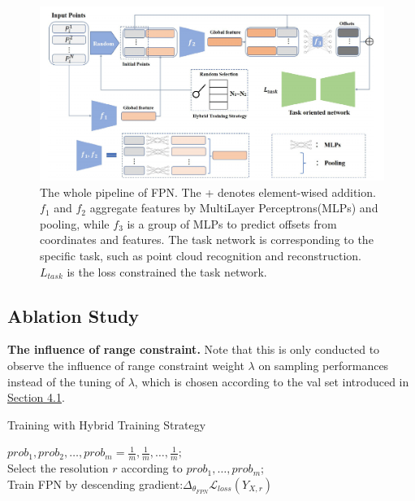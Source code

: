 \documentclass[14pt]{article}
\begin{document}
\begin{multicols}{2}
\begin{figure}
  \includegraphics[width=\linewidth]{image2.png}
  \caption{The whole pipeline of FPN. The + denotes element-wised addition. $f_1$ and $f_2$ aggregate features by MultiLayer Perceptrons(MLPs) and pooling, while $f_3$ is a group of MLPs to predict offsets from coordinates and features. The task network is corresponding to the speciﬁc task, such as point cloud recognition and reconstruction. $L_{task}$ is the loss constrained the task network.}
 \label{fig:fig2}
\end{figure}

\subsection{Ablation Study}
\textbf{The influence of range constraint.} Note that this is only conducted to observe the influence of range constraint weight $\lambda$ on sampling performances instead of the tuning of $\lambda$, which is chosen according to the val set introduced in \href{subsec:4.1}{Section 4.1}.

\begin{algorithm}[H]
 \label{alg:1}
 \caption{Training with Hybrid Training Strategy}
 \SetAlgoNoLine
 $prob_1, prob_2, \ldots, prob_m = \frac{1}{m}, \frac{1}{m}, \ldots, \frac{1}{m};$\\
 {
 Select the resolution $r$ according to $prob_1,\ldots, prob_m$;\\Train FPN by descending gradient:$\Delta_{\theta_{FPN}}\mathcal{L}_{loss}\left(Y_{X, r}\right)$\\
 }
\end{algorithm}

\printbibliography
\end{multicols}
\end{document}
